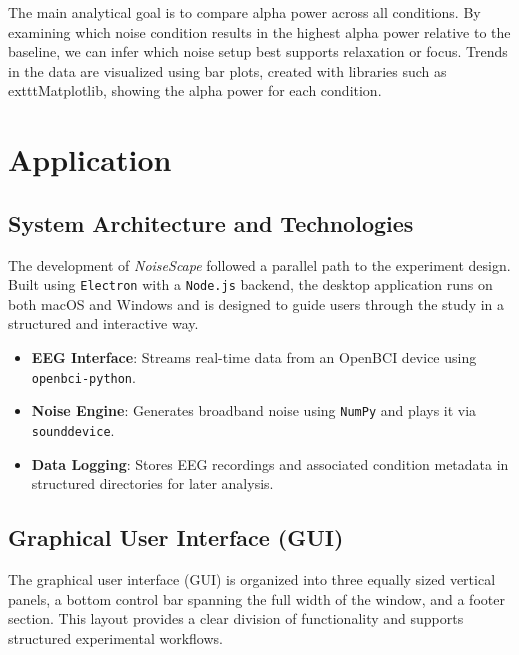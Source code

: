 The main analytical goal is to compare alpha power across all conditions. By examining which noise condition results in the highest alpha power relative to the baseline, we can infer which noise setup best supports relaxation or focus. Trends in the data are visualized using bar plots, created with libraries such as 	exttt{Matplotlib}, showing the alpha power for each condition.






\section{Application}

\subsection{System Architecture and Technologies}

The development of \textit{NoiseScape} followed a parallel path to the experiment design. Built using \texttt{Electron} with a \texttt{Node.js} backend, the desktop application runs on both macOS and Windows and is designed to guide users through the study in a structured and interactive way.

\begin{itemize}
\item \textbf{EEG Interface}: Streams real-time data from an OpenBCI device using \texttt{openbci-python}.
\item \textbf{Noise Engine}: Generates broadband noise using \texttt{NumPy} and plays it via \texttt{sounddevice}.
\item \textbf{Data Logging}: Stores EEG recordings and associated condition metadata in structured directories for later analysis.
\end{itemize}

\subsection{Graphical User Interface (GUI)}

The graphical user interface (GUI) is organized into three equally sized vertical panels, a bottom control bar spanning the full width of the window, and a footer section. This layout provides a clear division of functionality and supports structured experimental workflows.

